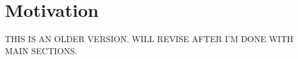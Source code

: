 %
%
\label{chap:intro}
\setcounter{page}{1}
\pagestyle{myheadings}


\newtheorem{definition}{Definition}
\newtheorem{proposition}{Proposition}


\section{Motivation}

THIS IS AN OLDER VERSION. WILL REVISE AFTER I'M DONE WITH MAIN SECTIONS.




